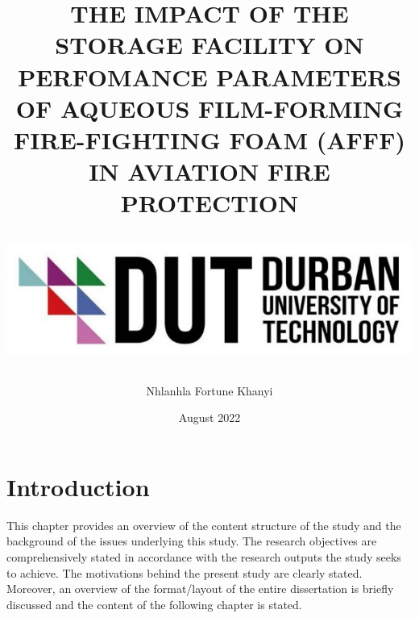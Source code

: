 \documentclass[12pt]{report}
\title {
    THE IMPACT OF THE STORAGE FACILITY ON PERFOMANCE PARAMETERS OF AQUEOUS FILM-FORMING FIRE-FIGHTING FOAM (AFFF) IN AVIATION FIRE PROTECTION

    \includegraphics[scale=1.5]{logo.png}
}
\author{Nhlanhla Fortune Khanyi}
\date{August 2022}
\begin{document}
\maketitle

\tableofcontents
\listoffigures
\listoftables

\printnomenclature

\makenomenclature

\chapter{Introduction}
This chapter provides an overview of the content structure of the study and the background of the issues underlying this study. The research objectives are comprehensively stated in accordance with the research outputs the study seeks to achieve. The motivations behind the present study are clearly stated. Moreover, an overview of the format/layout of the entire dissertation is briefly discussed and the content of the following chapter is stated. 
\end{document}
